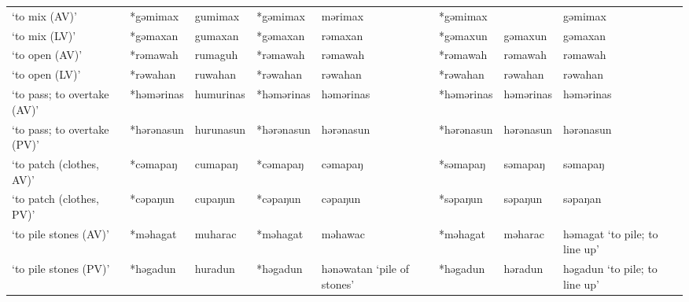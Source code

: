 \begin{landscape}
\begin{longtable}[c]{@{}p{3cm}<{\raggedright}p{2.75cm}<{\raggedright}p{2.75cm}<{\raggedright}p{2.75cm}<{\raggedright}p{2.75cm}<{\raggedright}p{2.75cm}<{\raggedright}p{2.75cm}<{\raggedright}p{2.75cm}<{\raggedright}@{}}
`to mix (AV)'                                        & *gəmimax           & gumimax                        & *gəmimax           & mərimax                    & *gəmimax         &                          & gəmimax                           \\
`to mix (LV)'                                        & *gəmaxan           & gumaxan                        & *gəmaxan           & rəmaxan                    & *gəmaxun         & gəmaxun                  & gəmaxan                           \\
`to open (AV)'                                       & *rəmawah           & rumaguh                        & *rəmawah           & rəmawah                    & *rəmawah         & rəmawah                  & rəmawah                           \\
`to open (LV)'                                       & *rəwahan           & ruwahan                        & *rəwahan           & rəwahan                    & *rəwahan         & rəwahan                  & rəwahan                           \\
`to pass; to overtake (AV)'                          & *həmərinas         & humurinas                      & *həmərinas         & həmərinas                  & *həmərinas       & həmərinas                & həmərinas                         \\
`to pass; to overtake (PV)'                          & *hərənasun         & hurunasun                      & *hərənasun         & hərənasun                  & *hərənasun       & hərənasun                & hərənasun                         \\
`to patch (clothes, AV)'                             & *cəmapaŋ           & cumapaŋ                        & *cəmapaŋ           & cəmapaŋ                    & *səmapaŋ         & səmapaŋ                  & səmapaŋ                           \\
`to patch (clothes, PV)'                             & *cəpaŋun           & cupaŋun                        & *cəpaŋun           & cəpaŋun                    & *səpaŋun         & səpaŋun                  & səpaŋan                           \\
`to pile stones (AV)'                                & *məhagat           & muharac                        & *məhagat           & məhawac                    & *məhagat         & məharac                  & həmagat `to pile; to line up'     \\
`to pile stones (PV)'                                & *həgadun           & huradun                        & *həgadun           & hənəwatan `pile of stones' & *həgadun         & həradun                  & həgadun `to pile; to line up'     \\

\end{longtable}
\end{landscape}
